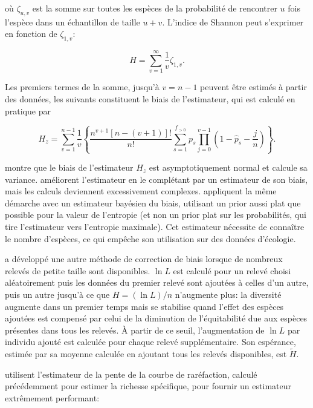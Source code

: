 \documentclass[
  11pt,
  american,
  a4paper,
  extrafontsizes,onecolumn,openright
  ]{memoir}
\newlength{\rf}
\begin{document}
où \(\zeta_{u,v}\) est la somme sur toutes les espèces de la probabilité de rencontrer \(u\) fois l'espèce dans un échantillon de taille \(u+v\).
L'indice de Shannon peut s'exprimer en fonction de \(\zeta_{1,v}\):

\begin{equation}
  \label{eq:HzetaInf}
  H = \sum^{\infty}_{v=1}{\frac{1}{v} \zeta_{1,v}}.
\end{equation}

Les premiers termes de la somme, jusqu'à \(v=n-1\) peuvent être estimés à partir des données, les suivants constituent le biais de l'estimateur, qui est calculé en pratique par

\begin{equation}
  \label{eq:Hzetanu}
  H_z 
  = \sum^{n-1}_{v=1}{\frac{1}{v}\left\{
    \frac{n^{v+1}\left[ n - \left(v + 1 \right) \right]!}{n!}
    \sum^{f_{>0}}_{s=1}{p_s \prod^{v-1}_{j=0}{
      \left( 1 - \hat{p}_s - \frac{j}{n} \right)}
    }
  \right\}}.
\end{equation}

\textcite{Zhang2013a} montre que le biais de l'estimateur \(H_z\) est asymptotiquement normal et calcule sa variance.
\textcite{Zhang2013} améliorent l'estimateur en le complétant par un estimateur de son biais, mais les calculs deviennent excessivement complexes.
\textcite{Vinck2012} appliquent la même démarche avec un estimateur bayésien du biais, utilisant un prior aussi plat que possible pour la valeur de l'entropie (et non un prior plat sur les probabilités, qui tire l'estimateur vers l'entropie maximale).
Cet estimateur nécessite de connaître le nombre d'espèces, ce qui empêche son utilisation sur des données d'écologie.

\textcite{Pielou1966} a développé une autre méthode de correction de biais lorsque de nombreux relevés de petite taille sont disponibles.
\(\ln{L}\) est calculé pour un relevé choisi aléatoirement puis les données du premier relevé sont ajoutées à celles d'un autre, puis un autre jusqu'à ce que \(H=(\ln{L}) / n\) n'augmente plus: la diversité augmente dans un premier temps mais se stabilise quand l'effet des espèces ajoutées est compensé par celui de la diminution de l'équitabilité due aux espèces présentes dans tous les relevés.
À partir de ce seuil, l'augmentation de \(\ln{L}\) par individu ajouté est calculée pour chaque relevé supplémentaire.
Son espérance, estimée par sa moyenne calculée en ajoutant tous les relevés disponibles, est \(\tilde{H}\).

\textcite{Chao2013} utilisent l'estimateur de la pente de la courbe de raréfaction, calculé précédemment \autocite{Chao2012b} pour estimer la richesse spécifique, pour fournir un estimateur extrêmement performant:
\end{document}
